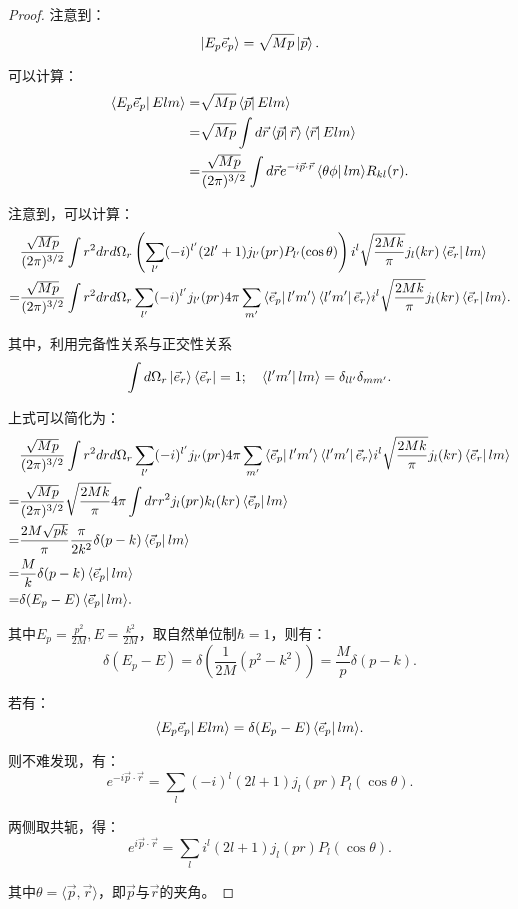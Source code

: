 \documentclass[reqno,a4paper,12pt]{amsart}
\begin{document}
\begin{proof}
注意到：
\[
	\ket{E_p \vec{e}_p} = \sqrt{Mp} \ket{\vec{p}}.
\]

可以计算：
\begin{align*}
	\bra{E_p \vec{e}_p} Elm \rangle =& \sqrt{Mp} \bra{\vec{p}} Elm \rangle \\
	=& \sqrt{Mp} \int d\vec{r} \bra{\vec{p}} \vec{r} \rangle \bra{\vec{r}} Elm \rangle \\
	=& \frac{\sqrt{Mp}}{(2\pi)^{3/2}} \int d\vec{r} e^{-i\vec{p} \cdot \vec{r}} \bra{\theta\phi} lm \rangle R_{kl}(r).
\end{align*}

注意到，可以计算：
\begin{align*}
	&\frac{\sqrt{Mp}}{(2\pi)^{3/2}} \int r^2dr d\Omega_r \left( \sum_{l'} (-i)^{l'} (2l'+1) j_{l'}(pr) P_{l'}(\cos\theta) \right) i^l \sqrt{\frac{2Mk}{\pi}} j_l(kr) \bra{\vec{e}_r} lm \rangle \\
	=& \frac{\sqrt{Mp}}{(2\pi)^{3/2}} \int r^2dr d\Omega_r \sum_{l'} (-i)^{l'} j_{l'}(pr) 4\pi \sum_{m'} \bra{\vec{e}_p} l'm' \rangle \bra{l'm'} \vec{e}_r \rangle i^l \sqrt{\frac{2Mk}{\pi}} j_l(kr) \bra{\vec{e}_r} lm \rangle.
\end{align*}

其中，利用完备性关系与正交性关系
\[
	\int d\Omega_r \ket{\vec{e}_r} \bra{\vec{e}_r} = 1; \ \ \ \bra{l'm'} lm \rangle = \delta_{ll'} \delta_{mm'}.
\]

上式可以简化为：
\begin{align*}
	&\frac{\sqrt{Mp}}{(2\pi)^{3/2}} \int r^2dr d\Omega_r \sum_{l'} (-i)^{l'} j_{l'}(pr) 4\pi \sum_{m'} \bra{\vec{e}_p} l'm' \rangle \bra{l'm'} \vec{e}_r \rangle i^l \sqrt{\frac{2Mk}{\pi}} j_l(kr) \bra{\vec{e}_r} lm \rangle \\
	=& \frac{\sqrt{Mp}}{(2\pi)^{3/2}} \sqrt{\frac{2Mk}{\pi}} 4\pi \int dr r^2 j_l(pr) k_l(kr) \bra{\vec{e}_p} lm \rangle \\
	=& \frac{2M\sqrt{pk}}{\pi} \frac{\pi}{2k^2}\delta(p-k) \bra{\vec{e}_p} lm \rangle \\
	=& \frac{M}{k} \delta(p-k) \bra{\vec{e}_p} lm \rangle \\
	=& \delta(E_p - E) \bra{\vec{e}_p} lm \rangle.
\end{align*}

其中$E_p = \frac{p^2}{2M}, E = \frac{k^2}{2M}$，取自然单位制$\hbar = 1$，则有：
\[
	\delta(E_p - E) = \delta(\frac{1}{2M}(p^2-k^2)) = \frac{M}{p} \delta(p-k).
\]

若有：
\[
	\bra{E_p \vec{e}_p} Elm \rangle = \delta(E_p-E) \bra{\vec{e}_p} lm \rangle.
\]

则不难发现，有：
\[
	e^{-i\vec{p}\cdot\vec{r}} = \sum_l (-i)^l (2l+1) j_l(pr) P_l(\cos\theta).
\]

两侧取共轭，得：
\[
	e^{i\vec{p} \cdot \vec{r}} = \sum_l i^l (2l+1) j_l(pr) P_l(\cos\theta).
\]

其中$\theta = \langle\vec{p}, \vec{r}\rangle$，即$\vec{p}$与$\vec{r}$的夹角。
\end{proof}
\end{document}
